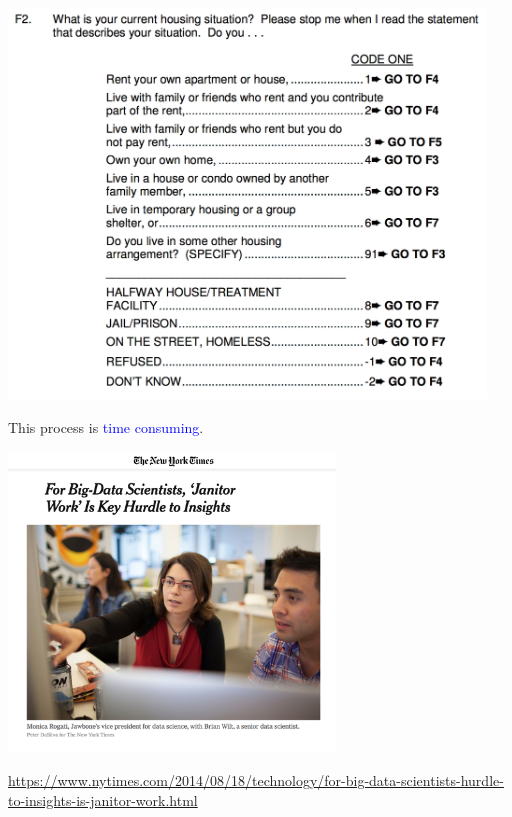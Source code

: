 \documentclass{beamer}
\begin{document}
\begin{frame}

\begin{center}
\includegraphics[width=0.95\textwidth]{figures/f5f2}
\end{center}

\end{frame}
\begin{frame}

This process is \textcolor{blue}{time consuming}.

\begin{center}
\includegraphics[width=0.65\textwidth]{figures/lohr_for_2014_nytimes_headline}
\end{center}

\vfill
\tiny{\url{https://www.nytimes.com/2014/08/18/technology/for-big-data-scientists-hurdle-to-insights-is-janitor-work.html}}

\end{frame}
\end{document}
